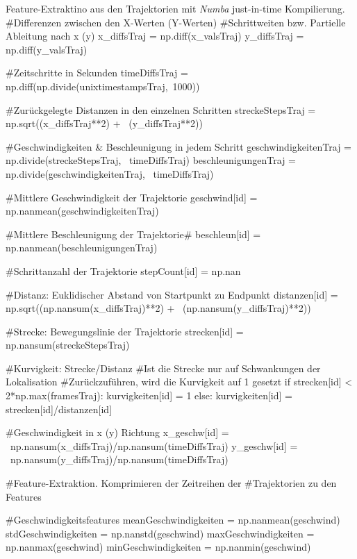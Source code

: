 \begin{pythoncodeAnhang}{Feature-Extraktino aus den Trajektorien mit \textit{Numba} just-in-time Kompilierung.}
        #Differenzen zwischen den X-Werten (Y-Werten)
        #Schrittweiten bzw. Partielle Ableitung nach x (y)
        x_diffsTraj = np.diff(x_valsTraj)
        y_diffsTraj = np.diff(y_valsTraj) 

        #Zeitschritte in Sekunden
        timeDiffsTraj = np.diff(np.divide(unixtimestampsTraj,\
                                1000))        

        #Zurückgelegte Distanzen in den einzelnen Schritten
        streckeStepsTraj = np.sqrt((x_diffsTraj**2) + \
                                    (y_diffsTraj**2))

        #Geschwindigkeiten & Beschleunigung in jedem Schritt
        geschwindigkeitenTraj = np.divide(streckeStepsTraj, \ 
                                        timeDiffsTraj)
        beschleunigungenTraj = np.divide(geschwindigkeitenTraj, \
                                        timeDiffsTraj)
        
        #Mittlere Geschwindigkeit der Trajektorie
        geschwind[id] = np.nanmean(geschwindigkeitenTraj)
        
        #Mittlere Beschleunigung der Trajektorie#
        beschleun[id] = np.nanmean(beschleunigungenTraj)
        
        #Schrittanzahl der Trajektorie
        stepCount[id] = np.nan

        #Distanz: Euklidischer Abstand von Startpunkt zu Endpunkt
        distanzen[id] = np.sqrt((np.nansum(x_diffsTraj)**2) + \
                                (np.nansum(y_diffsTraj)**2))  
        
        #Strecke: Bewegungslinie der Trajektorie
        strecken[id] = np.nansum(streckeStepsTraj)
        
        #Kurvigkeit: Strecke/Distanz
        #Ist die Strecke nur auf Schwankungen der Lokalisation 
        #Zurückzuführen, wird die Kurvigkeit auf 1 gesetzt
        if strecken[id] < 2*np.max(framesTraj):
            kurvigkeiten[id] = 1
        else:
            kurvigkeiten[id] = strecken[id]/distanzen[id]

        #Geschwindigkeit in x (y) Richtung
        x_geschw[id] = \
            np.nansum(x_diffsTraj)/np.nansum(timeDiffsTraj)
        y_geschw[id] = \
            np.nansum(y_diffsTraj)/np.nansum(timeDiffsTraj)

    #Feature-Extraktion. Komprimieren der Zeitreihen der 
    #Trajektorien zu den Features

    #Geschwindigkeitsfeatures
    meanGeschwindigkeiten = np.nanmean(geschwind)
    stdGeschwindigkeiten = np.nanstd(geschwind)
    maxGeschwindigkeiten = np.nanmax(geschwind)
    minGeschwindigkeiten = np.nanmin(geschwind)


\end{pythoncodeAnhang}
